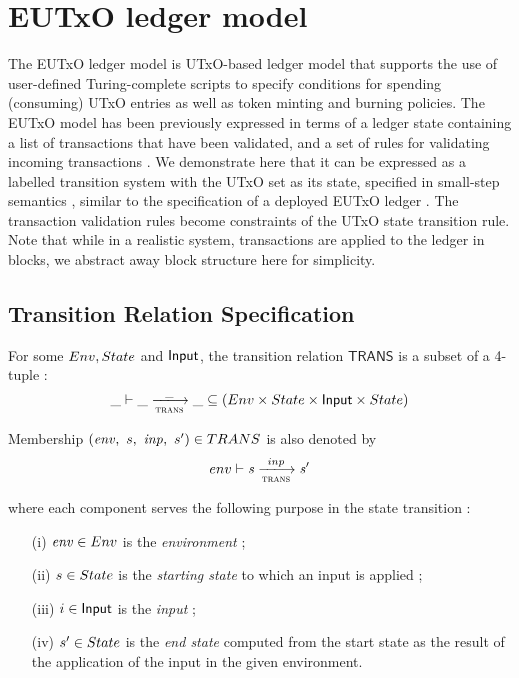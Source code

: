 \section{EUTxO ledger model}
\label{sec:ledger-rules}

The EUTxO ledger model is UTxO-based ledger model that supports the use of
user-defined Turing-complete scripts to specify conditions for spending (consuming)
UTxO entries as well as token minting and burning policies.
The EUTxO model has been previously expressed in terms of a ledger state containing a list of
transactions that have been validated, and a set of rules for validating incoming
transactions \cite{eutxoma}. We demonstrate here that it can be expressed as a labelled transition
system with the UTxO set as its state, specified in small-step semantics \cite{steps},
similar to the specification of a deployed EUTxO ledger \cite{alonzo}.
The transaction validation rules become constraints of the UTxO state transition
rule. Note that while in a realistic system, transactions are applied to the
ledger in blocks, we abstract away block structure here for simplicity.

\subsection{Transition Relation Specification}

For some $\Env, \State$ and $\textsf{Input}$, the transition relation $\mathsf{TRANS}$
is a subset of a 4-tuple :
  \begin{equation*}
    \_ \vdash
    \var{\_} \trans{trans}{\_} \var{\_}
    \subseteq (\Env \times \State \times \Input \times \State)
  \end{equation*}

Membership $(\var{env},~s,~\var{inp},~s') \in \mathsf{TRANS}$ is also denoted by
  \begin{equation*}
    env \vdash
    \var{s} \trans{trans}{inp} \var{s'}
  \end{equation*}

where each component serves the following purpose in the state transition :

\begin{itemize}
  \item[(i)] $\var{env} \in \Env$ is the \emph{environment} ;

  \item[(ii)] $s \in \State$ is the \emph{starting state}
  to which an input is applied ;

  \item[(iii)] $i \in \textsf{Input}$ is the \emph{input} ;

  \item[(iv)] $s' \in \State$ is the \emph{end state}
  computed from the start state as the result of the application of the input
  in the given environment.
\end{itemize}

